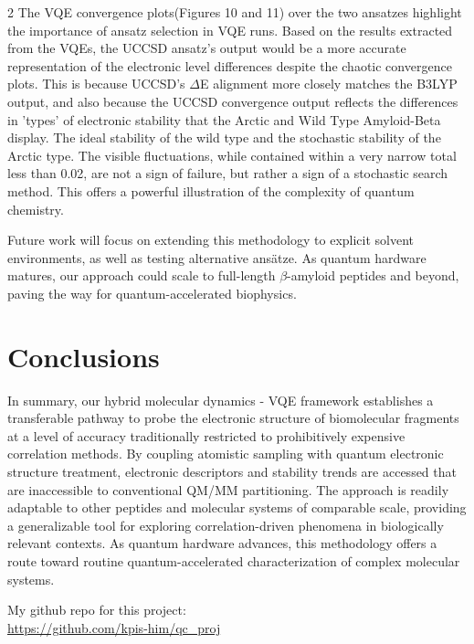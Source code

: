 \documentclass[10pt,a4paper]{article}
\begin{document}
\begin{multicols}{2}
The VQE convergence plots(Figures 10 and 11) over the two ansatzes highlight the importance of ansatz selection in VQE runs. Based on the results extracted from the VQEs, the UCCSD ansatz's output would be a more accurate representation of the electronic level differences despite the chaotic convergence plots. This is because UCCSD's $\Delta$E alignment more closely matches the B3LYP output, and also because the UCCSD convergence output reflects the differences in 'types' of electronic stability that the Arctic and Wild Type Amyloid-Beta display. The ideal stability of the wild type and the stochastic stability of the Arctic type. The visible fluctuations, while contained within a very narrow total less than 0.02, are not a sign of failure, but rather a sign of a stochastic search method. This offers a powerful illustration of the complexity of quantum chemistry. 

Future work will focus on extending this methodology to explicit solvent environments, as well as testing alternative ansätze. As quantum hardware matures, our approach could scale to full-length $\beta$-amyloid peptides and beyond, paving the way for quantum-accelerated biophysics.


\section{Conclusions}\label{sec4}

In summary, our hybrid molecular dynamics - VQE\cite{peruzzo2014} framework establishes a transferable pathway to probe the electronic structure of biomolecular fragments at a level of accuracy traditionally restricted to prohibitively expensive correlation methods. By coupling atomistic sampling with quantum electronic structure treatment, electronic descriptors and stability trends are accessed that are inaccessible to conventional QM/MM partitioning. The approach is readily adaptable to other peptides and molecular systems of comparable scale, providing a generalizable tool for exploring correlation-driven phenomena in biologically relevant contexts. As quantum hardware advances, this methodology offers a route toward routine quantum-accelerated characterization of complex molecular systems.

\end{multicols}
\clearpage


			

	
	\vspace{3cm}
	My github repo for this project:\\
	
	\url{https://github.com/kpis-him/qc_proj}
	
	
\end{document}
